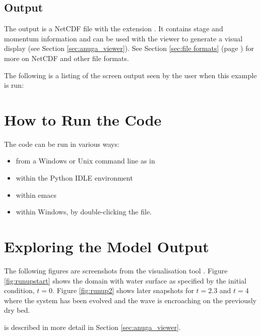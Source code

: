 \documentclass{manual}
\begin{document}
\subsection{Output}

The output is a NetCDF file with the extension . It
contains stage and momentum information and can be used with the
\anuga viewer  to generate a visual
display (see Section \ref{sec:anuga_viewer}). See Section \ref{sec:file formats}
(page \pageref{sec:file formats}) for more on NetCDF and other file
formats.

The following is a listing of the screen output seen by the user
when this example is run:




\section{How to Run the Code}

The code can be run in various ways:
\begin{itemize}
  \item{from a Windows or Unix command line} as in\ 
  \item{within the Python IDLE environment}
  \item{within emacs}
  \item{within Windows, by double-clicking the 
  file.}
\end{itemize}


\section{Exploring the Model Output}

The following figures are screenshots from the \anuga visualisation
tool . Figure \ref{fig:runupstart} shows the domain
with water surface as specified by the initial condition, $t=0$.
Figure \ref{fig:runup2} shows later snapshots for $t=2.3$ and
$t=4$ where the system has been evolved and the wave is encroaching
on the previously dry bed.

 is described in more detail in Section \ref{sec:anuga_viewer}.
\end{document}
